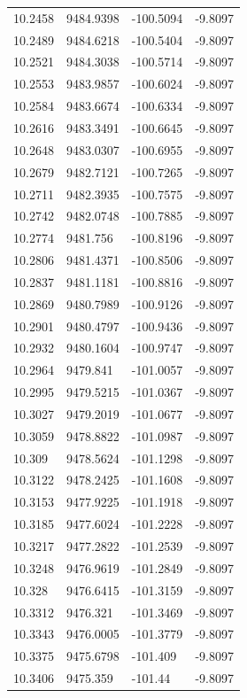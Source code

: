 \begin{table}[H]
\begin{tabular}{llll}
10.2458 & 9484.9398 & -100.5094 & -9.8097 \\
10.2489 & 9484.6218 & -100.5404 & -9.8097 \\
10.2521 & 9484.3038 & -100.5714 & -9.8097 \\
10.2553 & 9483.9857 & -100.6024 & -9.8097 \\
10.2584 & 9483.6674 & -100.6334 & -9.8097 \\
10.2616 & 9483.3491 & -100.6645 & -9.8097 \\
10.2648 & 9483.0307 & -100.6955 & -9.8097 \\
10.2679 & 9482.7121 & -100.7265 & -9.8097 \\
10.2711 & 9482.3935 & -100.7575 & -9.8097 \\
10.2742 & 9482.0748 & -100.7885 & -9.8097 \\
10.2774 & 9481.756 & -100.8196 & -9.8097 \\
10.2806 & 9481.4371 & -100.8506 & -9.8097 \\
10.2837 & 9481.1181 & -100.8816 & -9.8097 \\
10.2869 & 9480.7989 & -100.9126 & -9.8097 \\
10.2901 & 9480.4797 & -100.9436 & -9.8097 \\
10.2932 & 9480.1604 & -100.9747 & -9.8097 \\
10.2964 & 9479.841 & -101.0057 & -9.8097 \\
10.2995 & 9479.5215 & -101.0367 & -9.8097 \\
10.3027 & 9479.2019 & -101.0677 & -9.8097 \\
10.3059 & 9478.8822 & -101.0987 & -9.8097 \\
10.309 & 9478.5624 & -101.1298 & -9.8097 \\
10.3122 & 9478.2425 & -101.1608 & -9.8097 \\
10.3153 & 9477.9225 & -101.1918 & -9.8097 \\
10.3185 & 9477.6024 & -101.2228 & -9.8097 \\
10.3217 & 9477.2822 & -101.2539 & -9.8097 \\
10.3248 & 9476.9619 & -101.2849 & -9.8097 \\
10.328 & 9476.6415 & -101.3159 & -9.8097 \\
10.3312 & 9476.321 & -101.3469 & -9.8097 \\
10.3343 & 9476.0005 & -101.3779 & -9.8097 \\
10.3375 & 9475.6798 & -101.409 & -9.8097 \\
10.3406 & 9475.359 & -101.44 & -9.8097 \\

\end{tabular}
\end{table}
